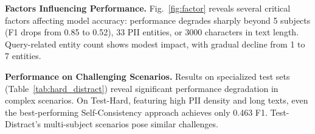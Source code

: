 
\noindent\textbf{Factors Influencing Performance.}
Fig.~\ref{fig:factor} reveals several critical factors affecting model accuracy: performance degrades sharply beyond 5 subjects (F1 drops from 0.85 to 0.52), 33 PII entities, or 3000 characters in text length. Query-related entity count shows modest impact, with gradual decline from 1 to 7 entities.


\noindent\textbf{Performance on Challenging Scenarios.}
Results on specialized test sets (Table~\ref{tab:hard_distract}) reveal significant performance degradation in complex scenarios. On Test-Hard, featuring high PII density and long texts, even the best-performing Self-Consistency approach achieves only 0.463 F1. Test-Distract's multi-subject scenarios pose similar challenges.